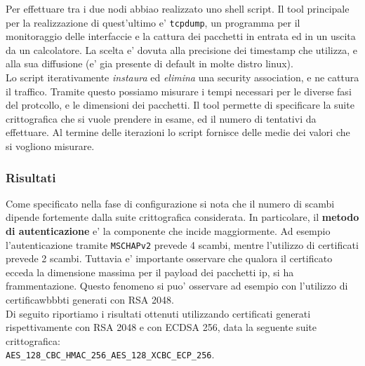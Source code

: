 \documentclass[
10pt, %
a4paper, %
oneside, %
headinclude,footinclude, %
BCOR5mm, %
]{scrartcl}
\begin{document}
Per effettuare tra i due nodi abbiao realizzato uno shell script. Il tool principale per la realizzazione di quest'ultimo e' \lstinline|tcpdump|, un programma per il monitoraggio delle interfaccie e la cattura dei pacchetti in entrata ed in un uscita da un calcolatore. 
La scelta e' dovuta alla precisione dei timestamp che utilizza, e alla sua diffusione (e' gia presente di default in molte distro linux).
\\ 

\noindent
Lo script iterativamente \textit{instaura} ed \textit{elimina} una security association, e ne cattura il traffico. Tramite questo possiamo misurare i tempi necessari per le diverse fasi del protcollo, e le dimensioni dei pacchetti.
Il tool permette di specificare la suite crittografica che si vuole prendere in esame, ed il numero di tentativi da effettuare.
Al termine delle iterazioni lo script fornisce delle medie dei valori che si vogliono misurare.

\subsubsection{Risultati}

Come specificato nella fase di configurazione si nota che il numero di scambi dipende fortemente dalla suite crittografica considerata.
In particolare, il \textbf{metodo di autenticazione} e' la componente che incide maggiormente. 
Ad esempio l'autenticazione tramite \lstinline|MSCHAPv2| prevede 4 scambi, mentre l'utilizzo di certificati prevede 2 scambi. 
Tuttavia e' importante osservare che qualora il certificato ecceda la dimensione massima per il payload dei pacchetti ip, si ha frammentazione. Questo fenomeno si puo' osservare ad esempio con l'utilizzo di certificawbbbti generati con RSA 2048.
\\

\noindent
Di seguito riportiamo i risultati ottenuti utilizzando certificati generati rispettivamente con RSA 2048 e con ECDSA 256, data la seguente suite crittografica: \\
\lstinline|AES_128_CBC_HMAC_256_AES_128_XCBC_ECP_256|.
\end{document}
